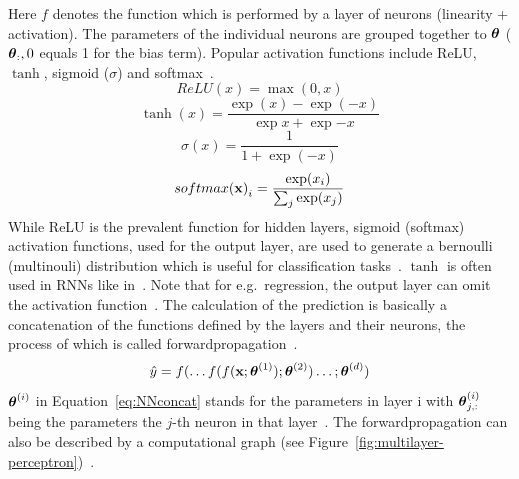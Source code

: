 Here $f$ denotes the function which is performed by a layer of neurons (linearity + activation).
The parameters of the individual neurons are grouped together to $\boldsymbol{\theta}$ ($\boldsymbol{\theta}_:,0$ equals 1 for the
bias term).
Popular activation functions include ReLU, $\tanh$, sigmoid ($\sigma$) and
softmax~\citep{shrestha_review_2019}.
\begin{equation}\label{eq:relu}
    ReLU(x)=\max(0,x)
\end{equation}
\begin{equation}\label{eq:tanh}
    \tanh(x)=\frac{\exp(x)-\exp(-x)}{\exp{x}+\exp{-x}}
\end{equation}
\begin{equation}\label{eq:sigmoid}
    \sigma(x)=\frac{1}{1+\exp(-x)}
\end{equation}
\begin{equation}\label{eq:softmax}
    {softmax(\textbf{x})}_i = \frac{\exp(x_i)}{\sum_j \exp(x_j)}
\end{equation}
While ReLU is the prevalent function for hidden layers, sigmoid (softmax) activation functions,
used for the output layer, are used to generate a bernoulli (multinouli) distribution which is
useful for classification tasks~\citep{goodfellow_deep_2016}.
$\tanh$ is often used in \acp{RNN} like in~\cite{sherstinsky_fundamentals_2020,greff_lstm_2017}.
Note that for e.g.\ regression, the output layer can omit the activation
function~\citep{goodfellow_deep_2016}.
The calculation of the prediction is basically a concatenation of the functions defined by the
layers and their neurons, the process of which is called
forwardpropagation~\citep{ponti_everything_2017,goodfellow_deep_2016}.
\begin{equation}\label{eq:NNconcat}
    \hat{y}=f(\ldots f(f(\textbf{x};\boldsymbol{\theta}^{(1)});\boldsymbol{\theta}^{(2)})\ldots;\boldsymbol{\theta}^{(d)})
\end{equation}
$\boldsymbol{\theta}^{(i)}$ in Equation~\ref{eq:NNconcat} stands for the parameters in layer i with $\boldsymbol{\theta}^{(i)}_{j,:}$
being the parameters the $j$-th neuron in that layer~\citep{goodfellow_deep_2016}.
The forwardpropagation can also be described by a computational graph (see
Figure~\ref{fig:multilayer-perceptron})~\citep{goodfellow_deep_2016}.

